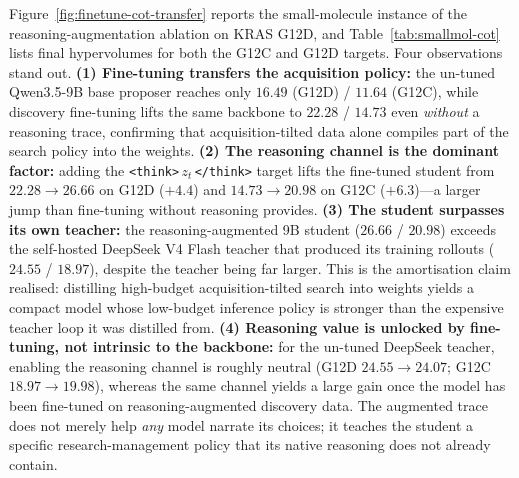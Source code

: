 Figure~\ref{fig:finetune-cot-transfer} reports the small-molecule instance of the reasoning-augmentation
ablation on KRAS G12D, and Table~\ref{tab:smallmol-cot} lists final hypervolumes for both the G12C and G12D
targets. Four observations stand out. \textbf{(1) Fine-tuning transfers the acquisition policy:} the un-tuned
Qwen3.5-9B base proposer reaches only $16.49$ (G12D) / $11.64$ (G12C), while discovery fine-tuning lifts the
same backbone to $22.28$ / $14.73$ even \emph{without} a reasoning trace, confirming that acquisition-tilted
data alone compiles part of the search policy into the weights. \textbf{(2) The reasoning channel is the
dominant factor:} adding the \texttt{<think>}\,$z_t$\,\texttt{</think>} target lifts the fine-tuned student from
$22.28\!\to\!26.66$ on G12D ($+4.4$) and $14.73\!\to\!20.98$ on G12C ($+6.3$)---a larger jump than fine-tuning
without reasoning provides. \textbf{(3) The student surpasses its own teacher:} the reasoning-augmented 9B
student ($26.66$ / $20.98$) exceeds the self-hosted DeepSeek V4 Flash teacher that produced its training
rollouts ($24.55$ / $18.97$), despite the teacher being far larger. This is the amortisation claim realised:
distilling high-budget acquisition-tilted search into weights yields a compact model whose low-budget inference
policy is stronger than the expensive teacher loop it was distilled from. \textbf{(4) Reasoning value is
unlocked by fine-tuning, not intrinsic to the backbone:} for the un-tuned DeepSeek teacher, enabling the
reasoning channel is roughly neutral (G12D $24.55\!\to\!24.07$; G12C $18.97\!\to\!19.98$), whereas the same
channel yields a large gain once the model has been fine-tuned on reasoning-augmented discovery data. The
augmented trace does not merely help \emph{any} model narrate its choices; it teaches the student a specific
research-management policy that its native reasoning does not already contain.

